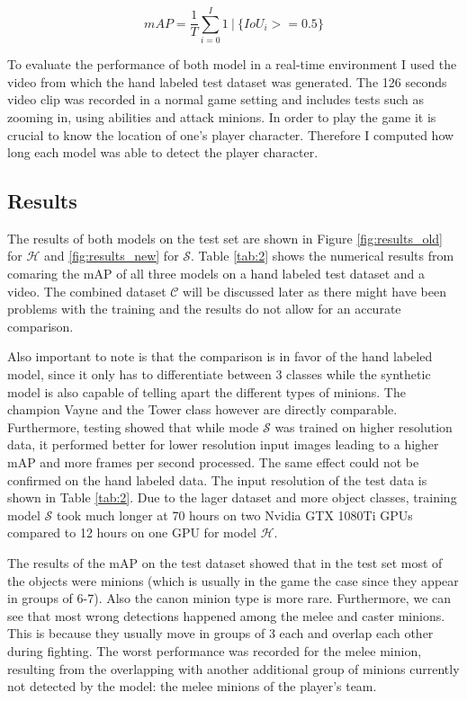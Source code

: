 \begin{equation}
mAP = \frac{1}{T} \sum^{I}_{i=0} 1~|~\{IoU_i >= 0.5\}
\end{equation}

To evaluate the performance of both model in a real-time environment I used the video from which the hand labeled test dataset was generated.
The 126 seconds video clip was recorded in a normal game setting and includes tests such as zooming in, using abilities and attack minions.
In order to play the game it is crucial to know the location of one's player character.
Therefore I computed how long each model was able to detect the player character.

\subsection{Results}
The results of both models on the test set are shown in Figure \ref{fig:results_old} for $\mathcal{H}$ and \ref{fig:results_new} for $\mathcal{S}$.
Table \ref{tab:2} shows the numerical results from comaring the mAP of all three models on a hand labeled test dataset and a video.
The combined dataset $\mathcal{C}$ will be discussed later as there might have been problems with the training and the results do not allow for an accurate comparison.

Also important to note is that the comparison is in favor of the hand labeled model, since it only has to differentiate between 3 classes while the synthetic model is also capable of telling apart the different types of minions.
The champion Vayne and the Tower class however are directly comparable.
Furthermore, testing showed that while mode $\mathcal{S}$ was trained on higher resolution data, it performed better for lower resolution input images leading to a higher mAP and more frames per second processed.
The same effect could not be confirmed on the hand labeled data.
The input resolution of the test data is shown in Table \ref{tab:2}.
Due to the lager dataset and more object classes, training model $\mathcal{S}$ took much longer at 70 hours on two Nvidia GTX 1080Ti GPUs compared to 12 hours on one GPU for model $\mathcal{H}$.

The results of the mAP on the test dataset showed that in the test set most of the objects were minions (which is usually in the game the case since they appear in groups of 6-7).
Also the canon minion type is more rare.
Furthermore, we can see that most wrong detections happened among the melee and caster minions.
This is because they usually move in groups of 3 each and overlap each other during fighting.
The worst performance was recorded for the melee minion, resulting from the overlapping with another additional group of minions currently not detected by the model: the melee minions of the player's team.

